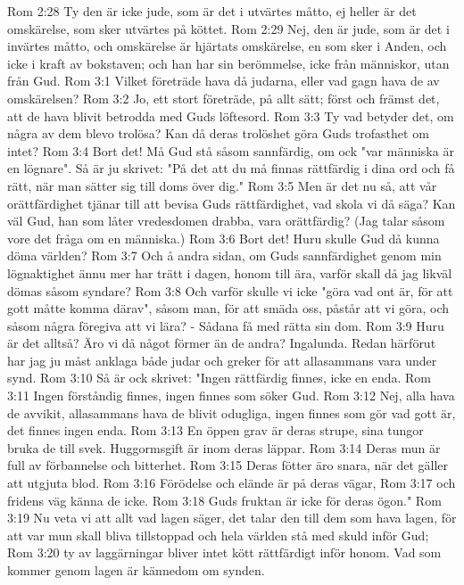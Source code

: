 Rom 2:28  Ty den är icke jude, som är det i utvärtes måtto, ej heller är det omskärelse, som sker utvärtes på köttet.
Rom 2:29  Nej, den är jude, som är det i invärtes måtto, och omskärelse är hjärtats omskärelse, en som sker i Anden, och icke i kraft av bokstaven; och han har sin berömmelse, icke från människor, utan från Gud.
Rom 3:1  Vilket företräde hava då judarna, eller vad gagn hava de av omskärelsen?
Rom 3:2  Jo, ett stort företräde, på allt sätt; först och främst det, att de hava blivit betrodda med Guds löftesord.
Rom 3:3  Ty vad betyder det, om några av dem blevo trolösa? Kan då deras trolöshet göra Guds trofasthet om intet?
Rom 3:4  Bort det! Må Gud stå såsom sannfärdig, om ock "var människa är en lögnare". Så är ju skrivet: "På det att du må finnas rättfärdig i dina ord och få rätt, när man sätter sig till doms över dig."
Rom 3:5  Men är det nu så, att vår orättfärdighet tjänar till att bevisa Guds rättfärdighet, vad skola vi då säga? Kan väl Gud, han som låter vredesdomen drabba, vara orättfärdig? (Jag talar såsom vore det fråga om en människa.)
Rom 3:6  Bort det! Huru skulle Gud då kunna döma världen?
Rom 3:7  Och å andra sidan, om Guds sannfärdighet genom min lögnaktighet ännu mer har trätt i dagen, honom till ära, varför skall då jag likväl dömas såsom syndare?
Rom 3:8  Och varför skulle vi icke "göra vad ont är, för att gott måtte komma därav", såsom man, för att smäda oss, påstår att vi göra, och såsom några föregiva att vi lära? - Sådana få med rätta sin dom.
Rom 3:9  Huru är det alltså? Äro vi då något förmer än de andra? Ingalunda. Redan härförut har jag ju måst anklaga både judar och greker för att allasammans vara under synd.
Rom 3:10  Så är ock skrivet: "Ingen rättfärdig finnes, icke en enda.
Rom 3:11  Ingen förståndig finnes, ingen finnes som söker Gud.
Rom 3:12  Nej, alla hava de avvikit, allasammans hava de blivit odugliga, ingen finnes som gör vad gott är, det finnes ingen enda.
Rom 3:13  En öppen grav är deras strupe, sina tungor bruka de till svek. Huggormsgift är inom deras läppar.
Rom 3:14  Deras mun är full av förbannelse och bitterhet.
Rom 3:15  Deras fötter äro snara, när det gäller att utgjuta blod.
Rom 3:16  Förödelse och elände är på deras vägar,
Rom 3:17  och fridens väg känna de icke.
Rom 3:18  Guds fruktan är icke för deras ögon."
Rom 3:19  Nu veta vi att allt vad lagen säger, det talar den till dem som hava lagen, för att var mun skall bliva tillstoppad och hela världen stå med skuld inför Gud;
Rom 3:20  ty av laggärningar bliver intet kött rättfärdigt inför honom. Vad som kommer genom lagen är kännedom om synden.
